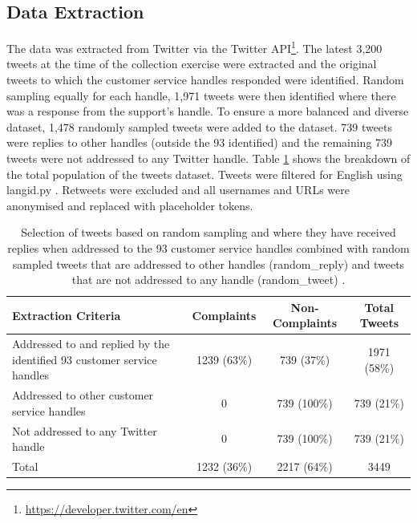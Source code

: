 \subsection{Data Extraction}
The data was extracted from Twitter via the Twitter API\footnote{\url{https://developer.twitter.com/en}}. The latest 3,200 tweets at the time of the collection exercise were extracted and the original tweets to which the customer service handles responded were identified. Random sampling equally for each handle, 1,971 tweets were then identified where there was a response from the support's handle. To ensure a more balanced and diverse dataset, 1,478 randomly sampled tweets were added to the dataset. 739 tweets were replies to other handles (outside the 93 identified) and the remaining 739 tweets were not addressed to any Twitter handle. Table \ref{tab: tweet_counts} shows the breakdown of the total population of the tweets dataset. Tweets were filtered for English using langid.py \cite{luiLangidPyOfftheshelf2012}. Retweets were excluded and all usernames and URLs were anonymised and replaced with placeholder tokens.
\begin{table}[ht]
    \captionsetup{font=small}
    \centering
    \begin{tabularx}{\textwidth}{|X|c|c|c|}
        \hline
        \rowcolor[gray]{0.7}
        \textbf{Extraction Criteria}                                           & \textbf{Complaints} & \textbf{Non-Complaints} & \textbf{Total Tweets} \\
        \hline
        Addressed to and replied by the identified 93 customer service handles & 1239 \small{(63\%)} & 739 \small{(37\%)}      & 1971 \small{(58\%)}   \\
        \hline
        Addressed to other customer service handles                            & 0                   & 739 \small{(100\%)}     & 739 \small{(21\%)}    \\
        \hline
        Not addressed to any Twitter handle                                    & 0                   & 739 \small{(100\%)}     & 739 \small{(21\%)}    \\
        \hline
        \rowcolor[gray]{0.9}
        Total                                                                  & 1232 \small{(36\%)} & 2217 \small{(64\%)}     & 3449                  \\
        \hline
    \end{tabularx}
    \caption{Selection of tweets based on random sampling and where they have received replies when addressed to the 93 customer service handles combined with random sampled tweets that are addressed to other handles (random\_reply) and tweets that are not addressed to any handle (random\_tweet) \cite{preotiuc-pietro_automatically_2019}.}
    \label{tab: tweet_counts}
\end{table}


